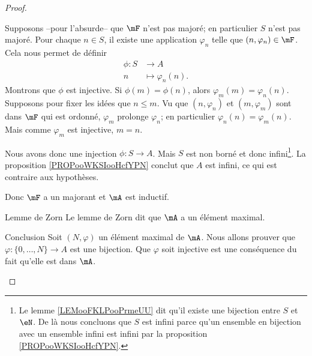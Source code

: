 \begin{proof}
\begin{subproof}
\begin{subproof}
        Supposons --pour l'absurde-- que \( \mF\) n'est pas majoré; en particulier \( S\) n'est pas majoré. Pour chaque \( n\in S\), il existe une application \( \varphi_n\) telle que \( (n,\varphi_n)\in\mF\). Cela nous permet de définir
        \begin{equation}
            \begin{aligned}
                \phi\colon S&\to A\\
                n&\mapsto \varphi_n(n). 
            \end{aligned}
        \end{equation}
        Montrons que \( \phi\) est injective. Si \( \phi(m)=\phi(n)\), alors \( \varphi_m(m)=\varphi_n(n)\). Supposons pour fixer les idées que \( n\leq m\). Vu que \( (n,\varphi_n)\) et \( (m,\varphi_m)\) sont dans \( \mF\) qui est ordonné, \( \varphi_m\) prolonge \( \varphi_n\); en particulier \( \varphi_n(n)=\varphi_m(n)\). Mais comme \( \varphi_m\) est injective, \( m=n\).

        Nous avons donc une injection \( \phi\colon S\to A\). Mais \( S\) est non borné et donc infini\footnote{Le lemme \ref{LEMooFKLPooPrmeUU} dit qu'il existe une bijection entre \( S\) et \( \eN\). De là nous concluons que \( S\) est infini parce qu'un ensemble en bijection avec un ensemble infini est infini par la proposition \ref{PROPooWKSIooHcfYPN}.}. La proposition \ref{PROPooWKSIooHcfYPN} conclut que \( A\) est infini, ce qui est contraire aux hypothèses.

        Donc \( \mF\) a un majorant et \( \mA\) est inductif.
    \item[Lemme de Zorn]
        Le lemme de Zorn dit que \( \mA\) a un élément maximal.
    \item[Conclusion]
        Soit \( (N,\varphi)\) un élément maximal de \( \mA\). Nous allons prouver que \( \varphi\colon \{ 0,\ldots, N \}\to A\) est une bijection. Que \( \varphi\) soit injective est une conséquence du fait qu'elle est dans \( \mA\).


\end{subproof}
\end{subproof}
\end{proof}
